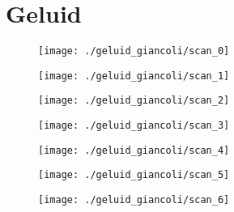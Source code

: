 
\chapter{Geluid}

\phantom{.}
%
%
%
%

\begin{figure}[h]
\centering
\texttt{[image: ./geluid\_giancoli/scan\_0]}
\end{figure}

\newpage

\begin{figure}[h]
\centering
\texttt{[image: ./geluid\_giancoli/scan\_1]}
\end{figure}

\newpage

\begin{figure}[h]
\centering
\texttt{[image: ./geluid\_giancoli/scan\_2]}
\end{figure}


\begin{figure}[h]
\centering
\texttt{[image: ./geluid\_giancoli/scan\_3]}
\end{figure}

\begin{figure}[h]
\centering
\texttt{[image: ./geluid\_giancoli/scan\_4]}
\end{figure}

\begin{figure}[h]
\centering
\texttt{[image: ./geluid\_giancoli/scan\_5]}
\end{figure}

\begin{figure}[h]
\centering
\texttt{[image: ./geluid\_giancoli/scan\_6]}
\end{figure}

